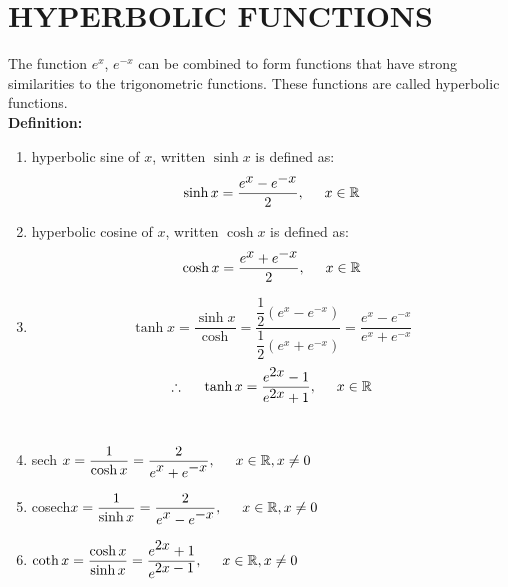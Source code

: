 \documentclass[11pt,a4paper]{article}
\begin{document}
\pagebreak
\section{HYPERBOLIC FUNCTIONS}

The function $e^x$, $e^{-x}$ can be combined to form functions that have strong similarities to the trigonometric functions. These functions are called hyperbolic functions.\\

\textbf{Definition:}
\begin{enumerate}
\item hyperbolic sine of $x$, written $\sinh x$ is defined as: $$\sinh x=\frac{e^{\displaystyle {x}}-e^{\displaystyle {-x}}}{2},\hspace{0.5cm} x\in \mathbb{R}$$
\item hyperbolic cosine of $x$, written $\cosh x$ is defined as: $$\cosh x =\frac{e^{\displaystyle {x}}+e^{\displaystyle {-x}}}{2},\hspace{0.5cm} x\in \mathbb{R}$$
\item $$\tanh x =\frac{\sinh x}{\cosh}=\frac{\dfrac{1}{2}(e^{\displaystyle {x}}-e^{\displaystyle {-x}})}{\dfrac{1}{2}(e^{\displaystyle {x}}+e^{\displaystyle {-x}})}=\frac{e^{\displaystyle {x}}-e^{\displaystyle {-x}}}{e^{\displaystyle {x}}+e^{\displaystyle {-x}}}$$
$$\therefore \hspace{0.5cm} \tanh x =\frac{e^{\displaystyle {2x}}-1}{e^{\displaystyle {2x}}+1}, \hspace{0.5cm} x\in \mathbb{R}$$\\

\item sech $x=\dfrac{1}{\cosh x} =\dfrac{2}{\displaystyle{e^{\displaystyle{x}}+e^{\displaystyle{-x}}}},\hspace{0.5cm} x\in \mathbb{R}, x\neq 0$\\

\item cosech$x=\dfrac{1}{\sinh x}=\dfrac{2}{\displaystyle{e^{\displaystyle{x}}-e^{\displaystyle{-x}}}},\hspace{0.5cm} x\in \mathbb{R}, x\neq 0$\\

\item $\coth x =\dfrac{\cosh x}{\sinh x}=\dfrac{\displaystyle{e^{\displaystyle{2x}}+1}}{\displaystyle{e^{\displaystyle{2x}-1}}},\hspace{0.5cm} x\in \mathbb{R},x\neq 0$\\
\end{enumerate}
\end{document}
